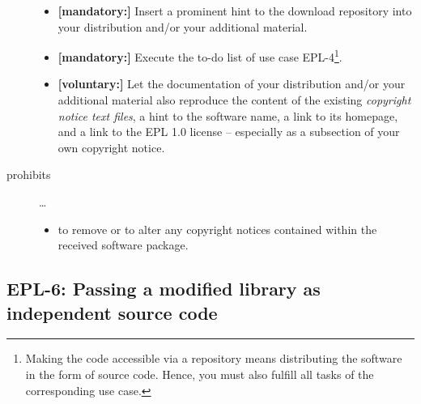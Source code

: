 \begin{description}
\begin{itemize}
  \item \textbf{[mandatory:]} Insert a prominent hint to the download repository
  into your distribution and/or your additional material.

  \item \textbf{[mandatory:]} Execute the to-do list of use case EPL-4\footnote{
  Making the code accessible via a repository means distributing the software in
  the form of source code. Hence, you must also fulfill all tasks of the
  corresponding use case.}.
 
  \item \textbf{[voluntary:]} Let the documentation of your distribution and/or
  your additional material  also reproduce the content of the existing
  \emph{copyright notice text files}, a hint to the software name, a link to its
  homepage, and a link to the EPL 1.0 license -- especially as a subsection of
  your own copyright notice.


\end{itemize}  

\item[prohibits] \ldots
\begin{itemize}
  \item to remove or to alter any copyright notices contained within the
  received software package.
\end{itemize}

\end{description}

\subsection{EPL-6: Passing a modified library as independent source code}
\label{OSUC-08-EPL}


